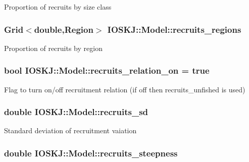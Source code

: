 Proportion of recruits by size class \hypertarget{classIOSKJ_1_1Model_a72f5daedbc9eeb857e665e4e371783d6}{
\subsubsection[{recruits\-\_\-regions}]{\setlength{\rightskip}{0pt plus 5cm}Grid$<$double,Region$>$ I\-O\-S\-K\-J\-::\-Model\-::recruits\-\_\-regions}}\label{classIOSKJ_1_1Model_a72f5daedbc9eeb857e665e4e371783d6}
Proportion of recruits by region \hypertarget{classIOSKJ_1_1Model_a88f9a0d53e76f9a88bf0d81c30bdb612}{
\subsubsection[{recruits\-\_\-relation\-\_\-on}]{\setlength{\rightskip}{0pt plus 5cm}bool I\-O\-S\-K\-J\-::\-Model\-::recruits\-\_\-relation\-\_\-on = true}}\label{classIOSKJ_1_1Model_a88f9a0d53e76f9a88bf0d81c30bdb612}
Flag to turn on/off recruitment relation (if off then recruits\-\_\-unfished is used) \hypertarget{classIOSKJ_1_1Model_aff3f79494f94a20043a0c57009129dea}{
\subsubsection[{recruits\-\_\-sd}]{\setlength{\rightskip}{0pt plus 5cm}double I\-O\-S\-K\-J\-::\-Model\-::recruits\-\_\-sd}}\label{classIOSKJ_1_1Model_aff3f79494f94a20043a0c57009129dea}
Standard deviation of recruitment vaiation \hypertarget{classIOSKJ_1_1Model_ae3660f3f79edc131d7b96cf391f6a902}{
\subsubsection[{recruits\-\_\-steepness}]{\setlength{\rightskip}{0pt plus 5cm}double I\-O\-S\-K\-J\-::\-Model\-::recruits\-\_\-steepness}}\label{classIOSKJ_1_1Model_ae3660f3f79edc131d7b96cf391f6a902}
